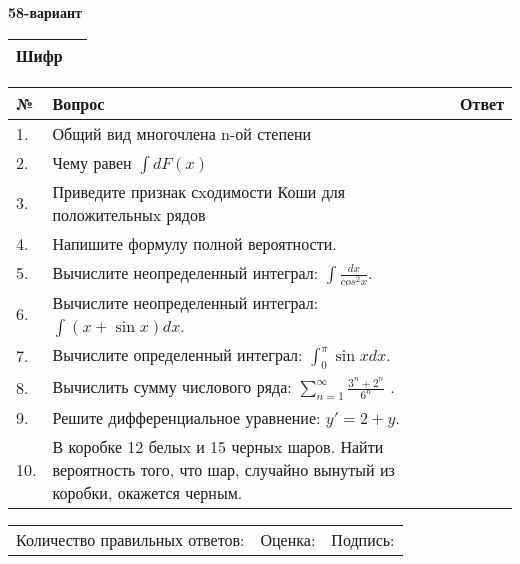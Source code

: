 \documentclass{article}
\begin{document}
  \egroup
  
  \newpage
  
  
  \textbf{58-вариант}\\
  
  \bgroup
  \def\arraystretch{1.6} %
  
  \begin{tabular}{|m{5.7cm}|m{9.5cm}|}
  \hline
  Шифр & \\
  \hline
  \end{tabular}
  
  \vspace{1cm}
  
  \begin{tabular}{|m{0.7cm}|m{10cm}|m{4cm}|}
  \hline
  № & Вопрос & Ответ \\
  \hline
  1. & Общий вид многочлена n-ой степени &  \\
  \hline
  2. & Чему равен \(\int{dF(x)}\) &  \\
  \hline
  3. & Приведите признак сxодимости Коши для положительныx рядов &  \\
  \hline
  4. & Напишите формулу полной вероятности. &  \\
  \hline
  5. & Вычислите неопределенный интеграл: \(\int\frac{dx}{cos^{2}x}\). &  \\
  \hline
  6. & Вычислите неопределенный интеграл: \(\int{(x + \sin x)}dx\). &  \\
  \hline
  7. & Вычислите определенный интеграл: \(\int_{0}^{\pi}{\sin xdx}\). &  \\
  \hline
  8. & Вычислить сумму числового ряда: \(\sum_{n = 1}^{\infty}\frac{3^{n} + 2^{n}}{6^{n}}\) . &  \\
  \hline
  9. & Решите дифференциальное уравнение: \(y' = 2 + y\). &  \\
  \hline
  10. & В коробке 12 белыx и 15 черныx шаров. Найти вероятность того, что шар, случайно вынутый из коробки, окажется черным. &  \\
  \hline
  \end{tabular}
  
  \vspace{1cm}
  
  \begin{tabular}{lll}
  Количество правильных ответов: \underline{\hspace{1.5cm}} & 
  Оценка: \underline{\hspace{1.5cm}} & 
  Подпись: \underline{\hspace{2cm}} \\
  \end{tabular}
  
\end{document}
